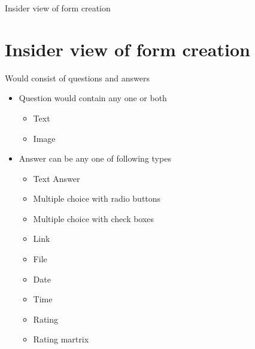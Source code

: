 \documentclass{beamer}
\begin{document}
\begin{frame}{Insider view of form creation}
    \section{Insider view of form creation}
    Would consist of questions and answers\\
    \begin{itemize}
        \item Question would contain any one or both
              \begin{itemize}
                  \item Text
                  \item Image
              \end{itemize}

        \item Answer can be any one of following types
              \begin{itemize}
                  \item Text Answer
                  \item Multiple choice with radio buttons
                  \item Multiple choice with check boxes
                  \item Link
                  \item File
                  \item Date
                  \item Time
                  \item Rating
                  \item Rating martrix
              \end{itemize}
    \end{itemize}
\end{frame}
\end{document}
